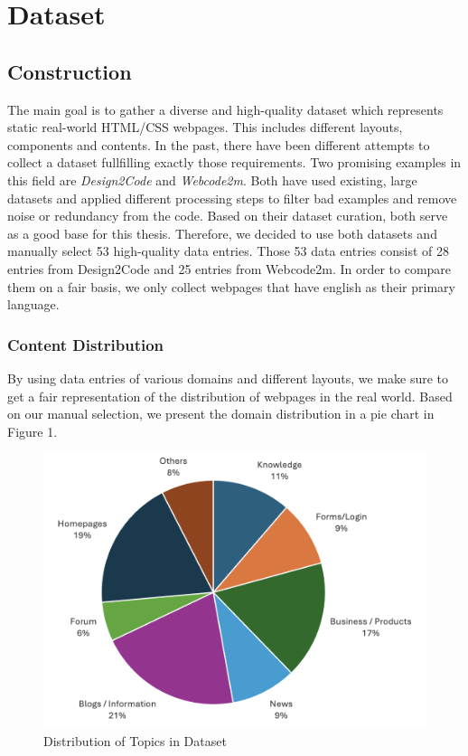 \chapter{Dataset}\label{chapter:Dataset}

\section{Construction}
The main goal is to gather a diverse and high-quality dataset which represents static
real-world HTML/CSS webpages. This includes different layouts, components and contents. 
In the past, there have been different attempts to collect a dataset fullfilling
exactly those requirements.\newline
Two promising examples in this field are \textit{Design2Code} and \textit{Webcode2m}. 
Both have used existing, large datasets and applied different processing steps to 
filter bad examples and remove noise or redundancy from the code. Based on their
dataset curation, both serve as a good base for this thesis.\newline
Therefore, we decided to use both datasets and manually select 53 high-quality data 
entries. Those 53 data entries consist of 28 entries from Design2Code and 25 entries
from Webcode2m. In order to compare them on a fair basis, we only collect webpages 
that have english as their primary language.

\subsection{Content Distribution}
By using data entries of various domains and different layouts, we make sure to get 
a fair representation of the distribution of webpages in the real world. Based on 
our manual selection, we present the domain distribution in a pie chart in Figure 1.

\begin{figure}[p]
  \centering
  \includegraphics[width=\textwidth]{figures/dataset_distribution.png}
  \caption{Distribution of Topics in Dataset}
  \label{fig:dataset_distribution}
\end{figure}

